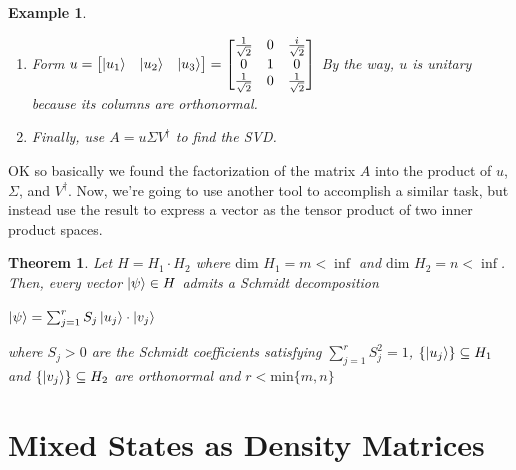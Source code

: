 \documentclass[12pt]{article}
\theoremstyle{plain}
\newtheorem{theorem}[lemma]{Theorem}
\theoremstyle{nonumberplain}
\theoremstyle{plain}
\newtheorem{example}[lemma]{Example}
\theoremstyle{nonumberplain}
\newcommand\1{{\bf 1}}
\newcommand{\bmat}[1]{\begin{bmatrix*} #1 \end{bmatrix*}} %
\newcommand{\C}{\mathbb{C}} %
\newcommand{\<}{\left\langle}
\renewcommand{\>}{\right\rangle}
\begin{document}
\begin{example}
\begin{enumerate}
\begin{enumerate}
Ok now we have some wacky new vectors which form an orthonormal basis for $\C^3$.
\end{enumerate}
\item Form $u=\bmat{\ket{u_1} & \ket{u_2} & \ket{u_3}}=
\bmat{
\frac{1}{\sqrt{2}} & 0 & \frac{i}{\sqrt{2}} \\
0 & 1 & 0 \\
\frac{1}{\sqrt{2}} & 0 & \frac{1}{\sqrt{2}}}$ By the way, $u$ is unitary because its columns are orthonormal.
\item Finally, use $A=u\Sigma V^\dagger$ to find the SVD.
\end{enumerate}
\end{example}
OK so basically we found the factorization of the matrix $A$ into the product of $u$,$\Sigma$, and $V^\dagger$. Now, we're going to use another tool to accomplish a similar task, but instead use the result to express a vector as the tensor product of two inner product spaces.
\begin{theorem}
Let $H=H_1\cdot H_2$ where $\text{dim } H_1=m<\inf$ and $\text{dim } H_2=n<\inf$. Then, every vector $\ket{\psi}\in H$ admits a Schmidt decomposition
\begin{center}
$\ket{\psi}=\sum^r_{j=1}S_j \ket{u_j}\cdot\ket{v_j}$
\end{center}
where $S_j>0$ are the Schmidt coefficients satisfying $\sum^r_{j=1}S_j^2=1$, $\lbrace\ket{u_j}\rbrace\subseteq H_1$ and $\lbrace\ket{v_j}\rbrace\subseteq H_2$ are orthonormal and $r<\text{min}\lbrace m,n\rbrace$
\end{theorem}


\section{Mixed States as Density Matrices}
\end{document}

